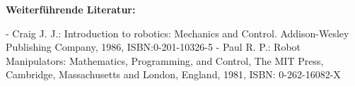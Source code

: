 \begin{course}
\begin{literature}
 

\textbf{Weiterführende Literatur:}

 

- Craig J. J.: Introduction to robotics: Mechanics and Control. Addison-Wesley Publishing Company, 1986, ISBN:0-201-10326-5\newline
\newline
- Paul R. P.: Robot Manipulators: Mathematics, Programming, and Control, The MIT Press, Cambridge, Massachusetts and London, England, 1981, ISBN: 0-262-16082-X

\end{literature}



\end{course}